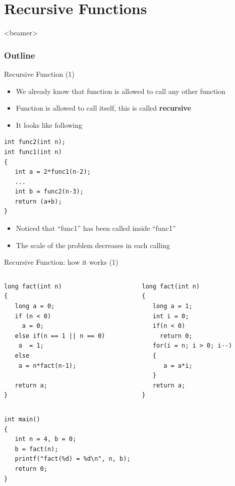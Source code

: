 \section{Recursive Functions}
\label{sec:recurs}
\begin{frame}<beamer>
    \frametitle{Outline}
    \tableofcontents[currentsection]
\end{frame}

\begin{frame}[fragile]{Recursive Function (1)}
\begin{itemize}
	\item {We already know that function is allowed to call any other function}
	\item {Function is allowed to call itself, this is called \textbf{recursive}}
	\item {It looks like following}
\end{itemize}
\begin{lstlisting}
int func2(int n);
int func1(int n)
{
   int a = 2*func1(n-2);
   ...
   int b = func2(n-3);
   return (a+b);
}
\end{lstlisting}

\begin{itemize}
	\item {Noticed that ``func1'' has been called inside ``func1''}
	\item {The scale of the problem decreases in each calling}
\end{itemize}

\end{frame}

\begin{frame}[fragile]{Recursive Function: how it works (1)}
\vspace{-0.28in}
\begin{columns}
\begin{column}{0.48\linewidth}
\begin{lstlisting}
long fact(int n)
{
   long a = 0;
   if (n < 0)
     a = 0;
   else if(n == 1 || n == 0)
    a  = 1;
   else
    a = n*fact(n-1);
    
   return a;
}
\end{lstlisting}
\end{column}
\begin{column}{0.45\linewidth}
\begin{lstlisting}
long fact(int n)
{
   long a = 1;
   int i = 0;
   if(n < 0)
     return 0;
   for(i = n; i > 0; i--)
   {
      a = a*i;
   }
   return a;
}
\end{lstlisting}
\end{column}
\end{columns}
\vspace{-0.16in}
\begin{lstlisting}
int main()
{
   int n = 4, b = 0;
   b = fact(n);
   printf("fact(%d) = %d\n", n, b);
   return 0;
}
\end{lstlisting}
\end{frame}

